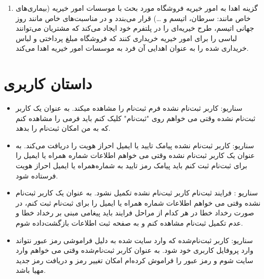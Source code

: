 \documentclass[14pt]{article}
\begin{document}
\begin{flushright}
\begin{enumerate}
\item گزینه اهدا به امور خیریه
\newline
فروشگاه مورد بحث با موسسات امور خیریه (بیماری‌های خاص مانند: سرطان، اتیسم و …) قرار می‌بندد و در مناسبت‌های خاص مانند روز جهانی اتیسم، طرح خیریه‌ای را در پلتفرم خود ایجاد می‌کند که مشتریان می‌توانند لباسی را برای امور خیریه خریداری کنند که فروشگاه مبلغ پرداختی و لباس خریداری شده را به عنوان اهدایی آن فرد به موسسات امور خیریه اهدا می‌کند.
\end{enumerate}
\section{داستان کاربری}


\begin{itemize}
\item سناریو: کاربر ثبت‌نام نشده فرم ثبت‌نام را مشاهده میکند.
\newline
به عنوان یک کاربر ثبت‌نام نشده
\newline
وقتی می خواهم روی "ثبت‌نام" کلیک کنم
\newline
باید فرمی را مشاهده کنم که به من امکان ثبت‌نام را بدهد.  

\item سناریو: کاربر ثبت‌نام نشده پیامک تایید یا ایمیل احراز هویت را دریافت می‌کند.
\newline
به عنوان یک کاربر ثبت‌نام نشده
\newline
وقتی می خواهم اطلاعات شماره همراه یا ایمیل را برای ثبت‌نام ثبت کنم
\newline
باید پیامک رمز تایید به شماره‌همراه یا ایمیل احراز هویت فرستاده شود.

\item سناریو :‌ فرایند ثبت‌نام کاربر ثبت‌نام نشده تکمیل نشود.
\newline
به عنوان یک کاربر ثبت‌نام نشده
\newline
وقتی می خواهم اطلاعات شماره همراه یا ایمیل را برای ثبت‌نام ثبت کنم، در صورت رخداد خطا در هر کدام از مراحل فرایند
\newline
باید پیغامی مبنی بر رخداد خطا و عدم تکمیل ثبت‌نام مشاهده کنم و به صفحه ثبت اطلاعات بازگشت‌داده شوم.
\item سناریو: کاربر ثبت‌نام‌شده که وارد سایت شده به دلیل فراموشی رمز عبور نتواند وارد پروفایل کاربری خود شود.
\newline
به عنوان کاربر ثبت‌نام‌شده
\newline
وقتی می خواهم وارد سایت شوم و رمز عبور را فراموش کرده‌ام
\newline
امکان تغییر رمز و دریافت رمز جدید مهیا باشد.


\end{itemize}
\end{flushright}
\end{document}
